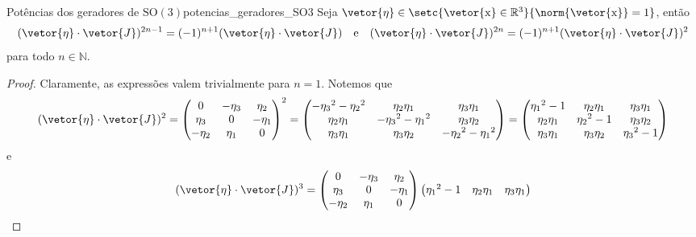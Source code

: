 \begin{lemma}{Potências dos geradores de \(\mathrm{SO}(3)\)}{potencias_geradores_SO3}
    Seja \(\vetor{\eta} \in \setc{\vetor{\mathrm{x}} \in \mathbb{R}^3}{\norm{\vetor{\mathrm{x}}} =1}\), então
    \begin{equation*}
        (\vetor{\eta} \cdot \vetor{J})^{2n - 1} = (-1)^{n+1} (\vetor{\eta}\cdot \vetor{J})\quad\text{e}\quad (\vetor{\eta}\cdot\vetor{J})^{2n} = (-1)^{n+1}(\vetor{\eta}\cdot \vetor{J})^2
    \end{equation*}
    para todo \(n \in \mathbb{N}\).
\end{lemma}
\begin{proof}
    Claramente, as expressões valem trivialmente para \(n = 1\). Notemos que
    \begin{equation*}
        (\vetor{\eta} \cdot \vetor{J})^2 = \begin{pmatrix}
            0 & -\eta_3 & \eta_2\\
            \eta_3 & 0 & -\eta_1\\
            -\eta_2 & \eta_1 & 0
        \end{pmatrix}^2 =
        \begin{pmatrix}
            -{\eta_3}^2 - {\eta_2}^2 & \eta_2 \eta_1 & \eta_3 \eta_1\\
            \eta_2 \eta_1 & -{\eta_3}^2 - {\eta_1}^2 & \eta_3 \eta_2\\
            \eta_3 \eta_1 & \eta_3 \eta_2 & -{\eta_2}^2 - {\eta_1}^2
        \end{pmatrix} =
        \begin{pmatrix}
            {\eta_1}^2-1 & \eta_2 \eta_1 & \eta_3 \eta_1\\
            \eta_2 \eta_1 & {\eta_2}^2 - 1 & \eta_3 \eta_2\\
            \eta_3 \eta_1 & \eta_3 \eta_2 & {\eta_3}^2 - 1
        \end{pmatrix}
    \end{equation*}
    e
    \begin{equation*}
        (\vetor{\eta} \cdot \vetor{J})^3 = \begin{pmatrix}
            0 & -\eta_3 & \eta_2\\
            \eta_3 & 0 & -\eta_1\\
            -\eta_2 & \eta_1 & 0
        \end{pmatrix}
        \begin{pmatrix}
            {\eta_1}^2-1 & \eta_2 \eta_1 & \eta_3 \eta_1\\

\end{pmatrix}
\end{equation*}
\end{proof}

